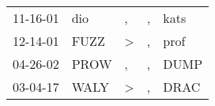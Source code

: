 \begin{supertabular}{p{0.07\textwidth}p{0.06\textwidth}p{0.02\textwidth}p{0.02\textwidth}p{0.06\textwidth}}
 11-16-01\textsuperscript{} &   dio\textsuperscript{} &             , &  , &  kats\textsuperscript{} \\
 12-14-01\textsuperscript{} &  FUZZ\textsuperscript{} &  \textgreater &  , &  prof\textsuperscript{} \\
 04-26-02\textsuperscript{} &  PROW\textsuperscript{} &             , &  , &  DUMP\textsuperscript{} \\
 03-04-17\textsuperscript{} &  WALY\textsuperscript{} &  \textgreater &  , &  DRAC\textsuperscript{} \\
\end{supertabular}
